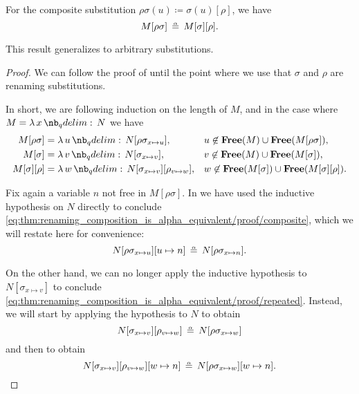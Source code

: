 \begin{proposition}\label{thm:substitution_composition_is_alpha_equivalent}
  For the composite substitution \( \rho\sigma(u) \coloneqq \sigma(u)[\rho] \), we have
  \begin{equation}\label{eq:thm:substitution_composition_is_alpha_equivalent}
    M[\rho\sigma] \aequiv M[\sigma][\rho].
  \end{equation}
\end{proposition}
\begin{comments}
  \item This result generalizes  to arbitrary substitutions.
\end{comments}
\begin{proof}
  We can follow the proof of  until the point where we use that \( \sigma \) and \( \rho \) are renaming substitutions.

  In short, we are following induction on the length of \( M \), and in the case where \( M = \qabs x N \) we have
  \begin{align*}
    M[\rho\sigma]   &= \qabs u N[\rho\sigma_{x \mapsto u}],                 &&u \not\in \op*{Free}(M) \cup \op*{Free}(M[\rho\sigma]), \\
    M[\sigma]       &= \qabs v N[\sigma_{x \mapsto v}],                     &&v \not\in \op*{Free}(M) \cup \op*{Free}(M[\sigma]), \\
    M[\sigma][\rho] &= \qabs w N[\sigma_{x \mapsto v}][\rho_{v \mapsto w}], &&w \not\in \op*{Free}(M[\sigma]) \cup \op*{Free}(M[\sigma][\rho]).
  \end{align*}

  Fix again a variable \( n \) not free in \( M[\rho\sigma] \). In  we have used the inductive hypothesis on \( N \) directly to conclude \eqref{eq:thm:renaming_composition_is_alpha_equivalent/proof/composite}, which we will restate here for convenience:
  \begin{equation}\label{eq:thm:substitution_composition_is_alpha_equivalent/proof/composite}
    N[\rho\sigma_{x \mapsto u}][u \mapsto n] \aequiv N[\rho\sigma_{x \mapsto n}].
  \end{equation}

  On the other hand, we can no longer apply the inductive hypothesis to \( N[\sigma_{x \mapsto v}] \) to conclude \eqref{eq:thm:renaming_composition_is_alpha_equivalent/proof/repeated}. Instead, we will start by applying the hypothesis to \( N \) to obtain
  \begin{equation*}
    N[\sigma_{x \mapsto v}][\rho_{v \mapsto w}] \aequiv N[\rho\sigma_{x \mapsto w}]
  \end{equation*}
  and then  to obtain
  \begin{equation*}
    N[\sigma_{x \mapsto v}][\rho_{v \mapsto w}][w \mapsto n] \aequiv N[\rho\sigma_{x \mapsto w}][w \mapsto n].
  \end{equation*}


\end{proof}
